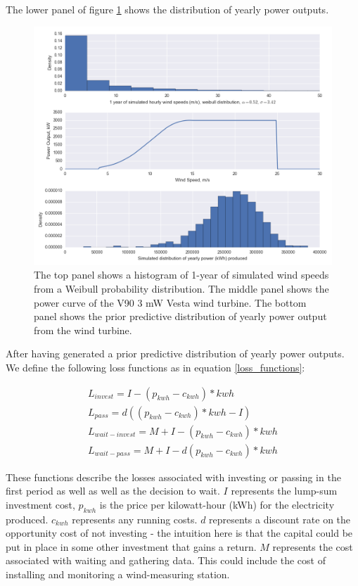 \documentclass[11pt]{article}
\begin{document}
The lower panel of figure \ref{power_output} shows the distribution of yearly power outputs.

\begin{figure}
	\centering
	\includegraphics[width=.8\textwidth]{figures/prior_power_distribution.png}
	\caption{The top panel shows a histogram of 1-year of simulated wind speeds from a Weibull probability distribution. The middle panel shows the power curve of the V90 3 mW Vesta wind turbine. The bottom panel shows the prior predictive distribution of yearly power output from the wind turbine.}
	\label{power_output}
\end{figure}

 After having generated a prior predictive distribution of yearly power outputs. We define the following loss functions as in equation \ref{loss_functions}:

\begin{align}
L_{invest} = I - (p_{kwh} - c_{kwh})*kwh\\
L_{pass} = d((p_{kwh} - c_{kwh})*kwh-I)\\
L_{wait-invest} = M + I - (p_{kwh} - c_{kwh})*kwh\\
L_{wait-pass} = M + I - d(p_{kwh} - c_{kwh})*kwh
\label{loss_functions}
\end{align}

These functions describe the losses associated with investing or passing in the first period as well as well as the decision to wait. $I$ represents the lump-sum investment cost, $p_{kwh}$ is the price per kilowatt-hour (kWh) for the electricity produced. $c_{kwh}$ represents any running costs. $d$ represents a discount rate on the opportunity cost of not investing - the intuition here is that the capital could be put in place in some other investment that gains a return. $M$ represents the cost associated with waiting and gathering data. This could include the cost of installing and monitoring a wind-measuring station.
\end{document}
